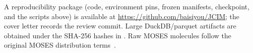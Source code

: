 \documentclass[journal=jcisd8,manuscript=article,email=false]{achemso}
\begin{document}
A reproducibility package (code, environment pins, frozen manifests, checkpoint, and the scripts above) is available at \url{https://github.com/baisiyou/JCIM}; the cover letter records the review commit. Large DuckDB/parquet artifacts are obtained under the SHA-256 hashes in . Raw MOSES molecules follow the original MOSES distribution terms~\citep{polykovskiy2020moses}.


\end{document}
